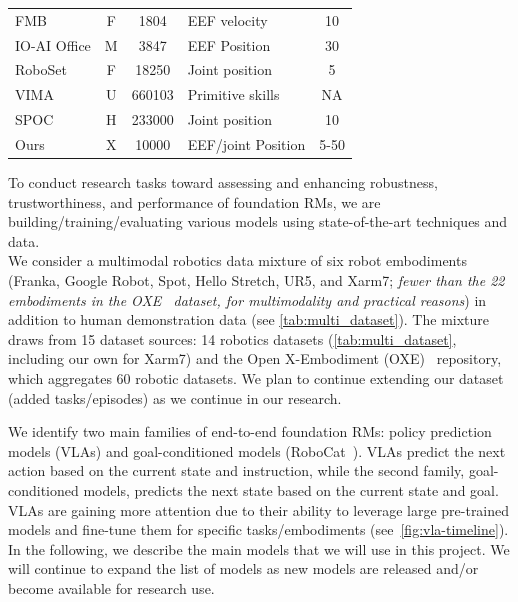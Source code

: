 \documentclass[11pt,letterpaper]{article}
\begin{document}
\begin{table}
{\begin{tabular}{p{4cm}ccp{4cm}c}
FMB \cite{luo2024fmb}                           & F        & 1804        & EEF velocity                           & 10                                                  \\
IO-AI Office \cite{9}    & M        & 3847        & EEF Position                           & 30                                                       \\
RoboSet\cite{bharadhwaj2023roboagent}                     & F        & 18250       & Joint position                         & 5                                        \\
VIMA \cite{jiang2023vima}                        & U          & 660103      & Primitive skills                       & NA                                               \\
SPOC \cite{spoc2023}                       & H & 233000      & Joint position                         & 10                                                     \\
Ours & X & 10000 & EEF/joint Position & 5-50 \\
\bottomrule
\end{tabular}}\vspace{-3ex}
\end{table}
To conduct research tasks toward assessing and enhancing robustness, trustworthiness, and performance of foundation RMs, we are  building/training/evaluating various models using state-of-the-art techniques and \xot data.\\
 We consider a multimodal robotics data mixture of
six robot embodiments (Franka, Google Robot, Spot, Hello Stretch, UR5, and Xarm7; \textit{fewer than the 22 embodiments in the OXE~\cite{9} dataset, for multimodality and practical reasons}) in addition to human demonstration data (see \autoref{tab:multi_dataset}). The mixture draws from 15 dataset sources: 14 robotics datasets (\autoref{tab:multi_dataset}, including our own for Xarm7) and the Open X-Embodiment (OXE)~\cite{9} repository, which  aggregates 60 robotic datasets.
We plan to continue extending our dataset (\ie added tasks/episodes) as we continue in our research.%




We identify two main families of end-to-end foundation RMs: policy prediction models (\eg VLAs) and goal-conditioned models (\eg RoboCat~\cite{bousmalis2023robocat}). VLAs predict the next action based on the current state and instruction, while the second family, goal-conditioned models, predicts the next state based on the current state and goal. VLAs are gaining more attention due to their ability to leverage large pre-trained models and fine-tune them for specific tasks/embodiments (see~\autoref{fig:vla-timeline}).
{In the following, we describe the main models that we will use in this project. We will continue to expand the list of models as new models are released and/or become available for research use.}
\end{document}
